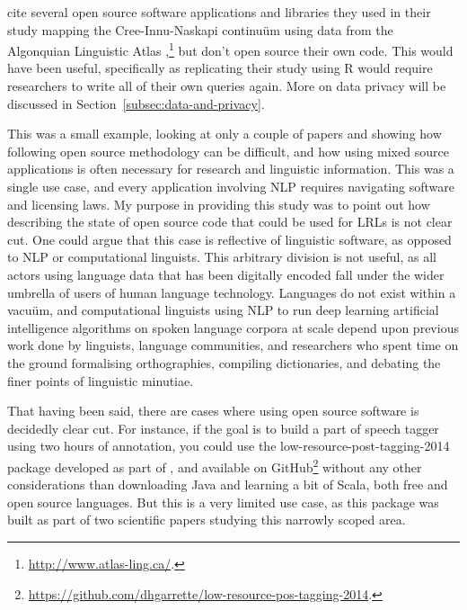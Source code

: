 \citet{cenerini2017mapping} cite several open source software applications and libraries they used in their study mapping the Cree-Innu-Naskapi continu\"{u}m using data from the Algonquian Linguistic Atlas \citep{junker2011linguistic},\footnote{\href{http://www.atlas-ling.ca/}{http://www.atlas-ling.ca/}. } but don't open source their own code. This would have been useful, specifically as replicating their study using R \citep{ihaka1996r} would require researchers to write all of their own queries again. More on data privacy will be discussed in Section~\ref{subsec:data-and-privacy}.

This was a small example, looking at only a couple of papers and showing how following open source methodology can be difficult, and how using mixed source applications is often necessary for research and linguistic information. This was a single use case, and every application involving NLP requires navigating software and licensing laws. My purpose in providing this study was to point out how describing the state of open source code that could be used for LRLs is not clear cut. One could argue that this case is reflective of linguistic software, as opposed to NLP or computational linguists. This arbitrary division is not useful, as all actors using language data that has been digitally encoded fall under the wider umbrella of users of human language technology. Languages do not exist within a vacu\"{u}m, and computational linguists using NLP to run deep learning artificial intelligence algorithms on spoken language corpora at scale depend upon previous work done by linguists, language communities, and researchers who spent time on the ground formalising orthographies, compiling dictionaries, and debating the finer points of linguistic minutiae.

That having been said, there are cases where using open source software is decidedly clear cut. For instance, if the goal is to build a part of speech tagger using two hours of annotation, you could use the low-resource-post-tagging-2014 package developed as part of \citet{garrette2013real,garrette2013learning}, and available on GitHub\footnote{\href{https://github.com/dhgarrette/low-resource-pos-tagging-2014}{https://github.com/dhgarrette/low-resource-pos-tagging-2014}. } without any other considerations than downloading Java and learning a bit of Scala, both free and open source languages. But this is a very limited use case, as this package was built as part of two scientific papers studying this narrowly scoped area.

